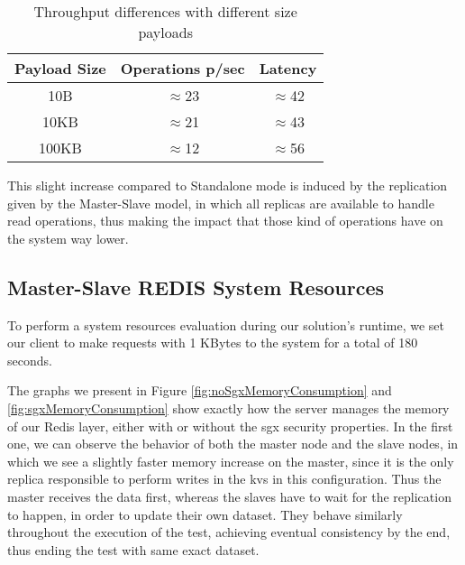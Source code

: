 \begin{table}[ht]
	\caption{Throughput differences with different size payloads} %
	\centering %
	\begin{tabular}{c c c} %
		\hline\hline %
		\textbf{Payload Size} & \textbf{Operations p/sec} & \textbf{Latency}\\ [0.5ex] %
		\hline
		10B & $\approx$23 & $\approx$42\\
		\hline
		10KB & $\approx$21 & $\approx$43\\
		\hline %
		100KB & $\approx$12 & $\approx$56\\ [1ex] %
		\hline %
	\end{tabular}
	\label{table:throughputPayloadsMS} %
\end{table} 

This slight increase compared to Standalone mode is induced by the replication given by the Master-Slave model, in which all replicas are available to handle read operations, thus making the impact that those kind of operations have on the system way lower.   


\subsection{Master-Slave REDIS System Resources}
\label{ssec:MSRedis_MemCPU}

To perform a system resources evaluation during our solution's runtime, we set our client to make requests with 1 KBytes to the system for a total of 180 seconds.  

The graphs we present in Figure \ref{fig:noSgxMemoryConsumption} and \ref{fig:sgxMemoryConsumption} show exactly how the server manages the memory of our Redis layer, either with or without the \gls{sgx} security properties. 
In the first one, we can observe the behavior of both the master node and the slave nodes, in which we see a slightly faster memory increase on the master, since it is the only replica responsible to perform writes in the \gls{kvs} in this configuration. Thus the master receives the data first, whereas the slaves have to wait for the replication to happen, in order to update their own dataset. 
They behave similarly throughout the execution of the test, achieving eventual consistency by the end, thus ending the test with same exact dataset. 

